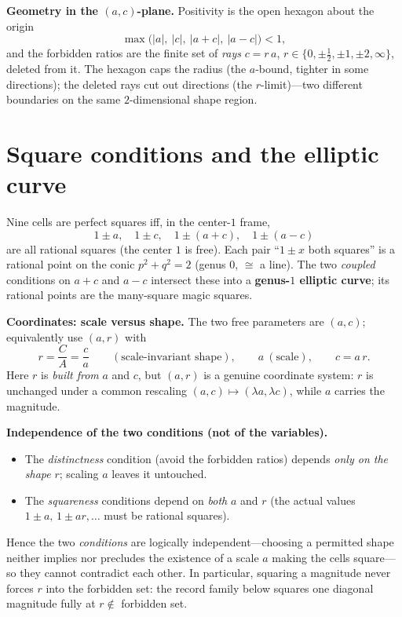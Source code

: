 \documentclass[11pt]{article}
\begin{document}
\medskip
\noindent\textbf{Geometry in the $(a,c)$-plane.} Positivity is the open hexagon
about the origin
\[
\max\bigl(|a|,\ |c|,\ |a+c|,\ |a-c|\bigr)<1,
\]
and the forbidden ratios are the finite set of \emph{rays} $c=r\,a$,
$r\in\{0,\pm\tfrac12,\pm1,\pm2,\infty\}$, deleted from it. The hexagon caps the
radius (the $a$-bound, tighter in some directions); the deleted rays cut out
directions (the $r$-limit)---two different boundaries on the same $2$-dimensional
shape region.

\section{Square conditions and the elliptic curve}

Nine cells are perfect squares iff, in the center-$1$ frame,
\[
1\pm a,\quad 1\pm c,\quad 1\pm(a+c),\quad 1\pm(a-c)
\]
are all rational squares (the center $1$ is free). Each pair
``$1\pm x$ both squares'' is a rational point on the conic $p^2+q^2=2$ (genus $0$,
$\cong$ a line). The two \emph{coupled} conditions on $a+c$ and $a-c$ intersect
these into a \textbf{genus-$1$ elliptic curve}; its rational points are the
many-square magic squares.

\medskip
\noindent\textbf{Coordinates: scale versus shape.} The two free parameters are
$(a,c)$; equivalently use $(a,r)$ with
\[
r=\frac{C}{A}=\frac{c}{a}\qquad(\text{scale-invariant shape}),\qquad
a\ (\text{scale}),\qquad c=a\,r .
\]
Here $r$ is \emph{built from} $a$ and $c$, but $(a,r)$ is a genuine coordinate
system: $r$ is unchanged under a common rescaling $(a,c)\mapsto(\lambda a,\lambda c)$,
while $a$ carries the magnitude.

\medskip
\noindent\textbf{Independence of the two conditions (not of the variables).}
\begin{itemize}[nosep]
\item The \emph{distinctness} condition (avoid the forbidden ratios) depends
\emph{only on the shape} $r$; scaling $a$ leaves it untouched.
\item The \emph{squareness} conditions depend on \emph{both} $a$ and $r$
(the actual values $1\pm a,\,1\pm ar,\dots$ must be rational squares).
\end{itemize}
Hence the two \emph{conditions} are logically independent---choosing a permitted
shape neither implies nor precludes the existence of a scale $a$ making the cells
square---so they cannot contradict each other. In particular, squaring a
magnitude never forces $r$ into the forbidden set: the record family below squares
one diagonal magnitude fully at $r\notin$ forbidden set.
\end{document}
